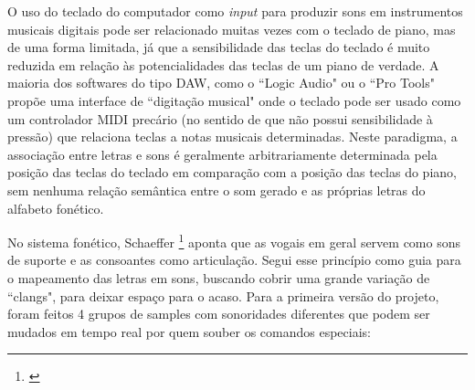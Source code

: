 O uso do teclado do computador como \emph{input} para produzir sons em instrumentos musicais digitais pode ser relacionado muitas vezes com o teclado de piano, mas de uma forma limitada, já que a sensibilidade das teclas do teclado é muito reduzida em relação às potencialidades das teclas de um piano de verdade. A maioria dos softwares do tipo DAW, como o ``Logic Audio" ou o ``Pro Tools" propõe uma interface de ``digitação musical" onde o teclado pode ser usado como um controlador MIDI precário (no sentido de que não possui sensibilidade à pressão) que relaciona teclas a notas musicais determinadas. Neste paradigma, a associação entre letras e sons é geralmente arbitrariamente determinada pela posição das teclas do teclado em comparação com a posição das teclas do piano, sem nenhuma relação semântica entre o som gerado e as próprias letras do alfabeto fonético. 


No sistema fonético, Schaeffer \footnote{\cite{Schaeffer2007}} aponta que as vogais em geral servem como sons de suporte e as consoantes como articulação. Segui esse princípio como guia para o mapeamento das letras em sons, buscando cobrir uma grande variação de ``clangs", para deixar espaço para o acaso. Para a primeira versão do projeto, foram feitos 4 grupos de samples com sonoridades diferentes que podem ser mudados em tempo real por quem souber os comandos especiais: 

